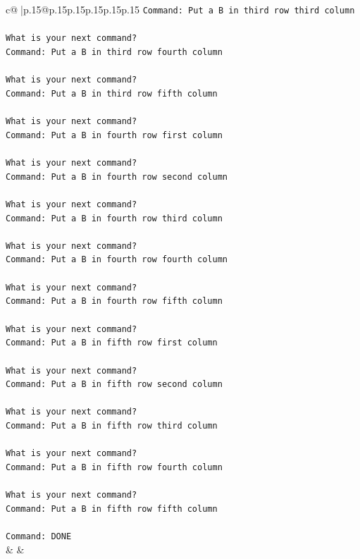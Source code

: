 \documentclass{article}
\begin{document}
{\begin{supertabular}{c@{$\;$}|p{.15\linewidth}@{}p{.15\linewidth}p{.15\linewidth}p{.15\linewidth}p{.15\linewidth}p{.15\linewidth}}
{{{\texttt{Command: Put a B in third row third column} \\
\\ 
\texttt{What is your next command?} \\
\texttt{Command: Put a B in third row fourth column} \\
\\ 
\texttt{What is your next command?} \\
\texttt{Command: Put a B in third row fifth column} \\
\\ 
\texttt{What is your next command?} \\
\texttt{Command: Put a B in fourth row first column} \\
\\ 
\texttt{What is your next command?} \\
\texttt{Command: Put a B in fourth row second column} \\
\\ 
\texttt{What is your next command?} \\
\texttt{Command: Put a B in fourth row third column} \\
\\ 
\texttt{What is your next command?} \\
\texttt{Command: Put a B in fourth row fourth column} \\
\\ 
\texttt{What is your next command?} \\
\texttt{Command: Put a B in fourth row fifth column} \\
\\ 
\texttt{What is your next command?} \\
\texttt{Command: Put a B in fifth row first column} \\
\\ 
\texttt{What is your next command?} \\
\texttt{Command: Put a B in fifth row second column} \\
\\ 
\texttt{What is your next command?} \\
\texttt{Command: Put a B in fifth row third column} \\
\\ 
\texttt{What is your next command?} \\
\texttt{Command: Put a B in fifth row fourth column} \\
\\ 
\texttt{What is your next command?} \\
\texttt{Command: Put a B in fifth row fifth column} \\
\\ 
\texttt{Command: DONE} \\
            }
        }
    }
    & & \\ \\


\end{supertabular}}
\end{document}

